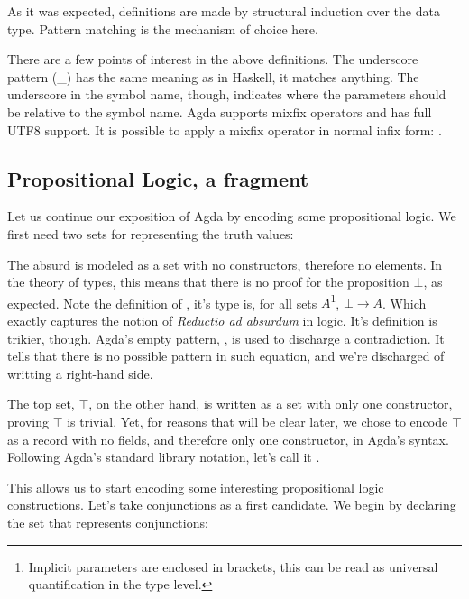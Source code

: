 As it was expected, definitions are made by structural induction over the
data type. Pattern matching is the mechanism of choice here.


There are a few points of interest in the above definitions. The underscore pattern
(\_) has the same meaning as in Haskell, it matches anything. The underscore in
the symbol name, though, indicates where the parameters should be relative to the symbol name. 
Agda supports mixfix operators and has full UTF8 support. It is possible to
apply a mixfix operator in normal infix form: .

\subsection{Propositional Logic, a fragment}

Let us continue our exposition of Agda by encoding some propositional logic. 
We first need two sets for representing the truth values:


The absurd is modeled as a set with no constructors, therefore no elements. In the theory of types,
this means that there is no proof for the proposition $\bot$, as expected. Note the definition
of , it's type is, for all sets $A$\footnote{
Implicit parameters are enclosed in brackets, this can be read as universal quantification in
the type level.
}, $\bot \rightarrow A$. Which exactly captures
the notion of \emph{Reductio ad absurdum} in logic. It's definition is trikier, though.
Agda's empty pattern, \inlagda{()}, is used to discharge a contradiction. It tells
that there is no possible pattern in such equation, and we're discharged of writting
a right-hand side.

The top set, $\top$, on the other
hand, is written as a set with only one constructor, proving $\top$ is trivial. Yet, for reasons that will be clear 
later, we chose to encode $\top$ as a record with no fields, and therefore only one constructor,  in Agda's syntax.
Following Agda's standard library notation, let's call it .


This allows us to start encoding some interesting propositional logic constructions. Let's take
conjunctions as a first candidate. We begin by declaring the set that represents conjunctions:

